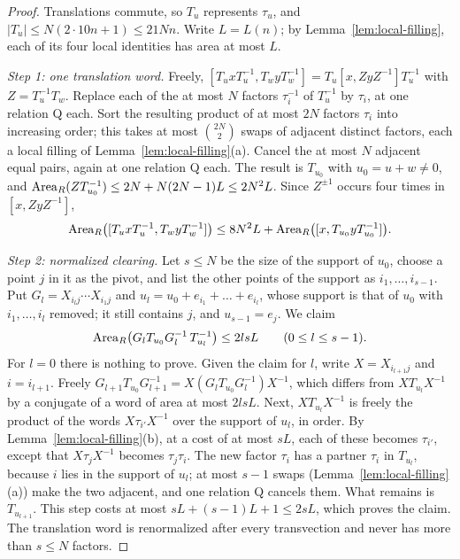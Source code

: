 \begin{proof}
Translations commute, so $T_u$ represents $\tau_u$, and $|T_u|\le N(2\cdot10n+1)\le21Nn$. Write $L=L(n)$; by Lemma~\ref{lem:local-filling},
each of its four local identities has area at most $L$.

\emph{Step 1: one translation word.} Freely, $[T_uxT_u^{-1},T_wyT_w^{-1}]=T_u[x,ZyZ^{-1}]T_u^{-1}$ with $Z=T_u^{-1}T_w$. Replace each of the at
most $N$ factors $\tau_i^{-1}$ of $T_u^{-1}$ by $\tau_i$, at one relation \textsf{Q} each. Sort the resulting product of at most $2N$ factors
$\tau_i$ into increasing order; this takes at most $\binom{2N}2$ swaps of adjacent distinct factors, each a local filling of
Lemma~\ref{lem:local-filling}(a). Cancel the at most $N$ adjacent equal pairs, again at one relation \textsf{Q} each. The result is $T_{u_0}$ with
$u_0=u+w\ne0$, and $\operatorname{Area}_R(ZT_{u_0}^{-1})\le2N+N(2N-1)L\le2N^2L$. Since $Z^{\pm1}$ occurs four times in $[x,ZyZ^{-1}]$,
\[
\operatorname{Area}_R\bigl([T_uxT_u^{-1},T_wyT_w^{-1}]\bigr)\le8N^2L+\operatorname{Area}_R\bigl([x,T_{u_0}yT_{u_0}^{-1}]\bigr).
\]

\emph{Step 2: normalized clearing.} Let $s\le N$ be the size of the support of $u_0$, choose a point $j$ in it as the pivot, and list the other
points of the support as $i_1,\dots,i_{s-1}$. Put $G_l=X_{i_lj}\cdots X_{i_1j}$ and $u_l=u_0+e_{i_1}+\dots+e_{i_l}$, whose support is that of $u_0$
with $i_1,\dots,i_l$ removed; it still contains $j$, and $u_{s-1}=e_j$. We claim
\[
\operatorname{Area}_R\bigl(G_lT_{u_0}G_l^{-1}\,T_{u_l}^{-1}\bigr)\le2lsL\qquad(0\le l\le s-1).
\]
For $l=0$ there is nothing to prove. Given the claim for $l$, write $X=X_{i_{l+1}j}$ and $i=i_{l+1}$. Freely
$G_{l+1}T_{u_0}G_{l+1}^{-1}=X(G_lT_{u_0}G_l^{-1})X^{-1}$, which differs from $XT_{u_l}X^{-1}$ by a conjugate of a word of area at most $2lsL$. Next,
$XT_{u_l}X^{-1}$ is freely the product of the words $X\tau_{i'}X^{-1}$ over the support of $u_l$, in order. By Lemma~\ref{lem:local-filling}(b),
at a cost of at most $sL$, each of these becomes $\tau_{i'}$, except that $X\tau_jX^{-1}$ becomes $\tau_j\tau_i$. The new factor $\tau_i$ has a
partner $\tau_i$ in $T_{u_l}$, because $i$ lies in the support of $u_l$; at most $s-1$ swaps (Lemma~\ref{lem:local-filling}(a)) make the two
adjacent, and one relation \textsf{Q} cancels them. What remains is $T_{u_{l+1}}$. This step costs at most $sL+(s-1)L+1\le2sL$, which proves the
claim. The translation word is renormalized after every transvection and never has more than $s\le N$ factors.


\end{proof}
